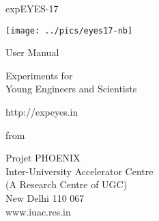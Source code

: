 \documentclass[12pt,a4paper]{report}
\begin{document}
\begin{titlepage}
\thispagestyle{empty}

\vspace{0.2in}

\begin{center}
{\Huge{}expEYES-17}
\par\end{center}{\Huge \par}

\begin{center}
\texttt{[image: ../pics/eyes17-nb]}
\par\end{center}

\begin{center}
{\large{}User Manual }
\par\end{center}{\large \par}

\begin{center}
{\LARGE{} Experiments for}\\
{\LARGE{} Young Engineers and Scientists}
\par\end{center}{\LARGE \par}

\begin{center}
http://expeyes.in
\par\end{center}

\begin{center}
from
\par\end{center}

\begin{center}
Projet PHOENIX\\
Inter-University Accelerator Centre \\
(A Research Centre of UGC)\\
New Delhi 110 067\\
www.iuac.res.in
\par\end{center}

\end{titlepage}
\end{document}
